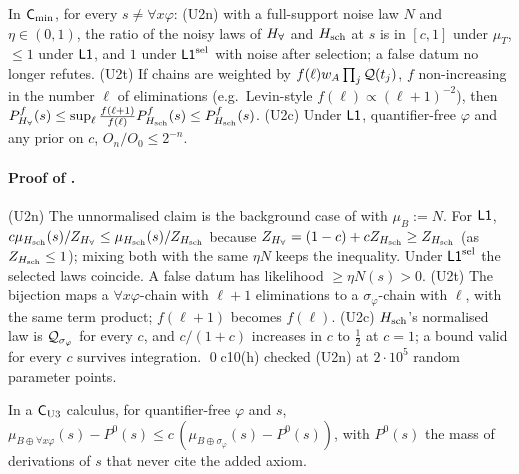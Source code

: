 \begin{proposition}\label{prop:univ:robust}
In $\mathsf{C}_{\min}$, for every $s\neq\forall x\varphi$: \textup{(U2n)} with a full-support noise law $N$ and $\eta\in(0,1)$, the ratio of the noisy laws of $H_{\forall}$ and $H_{\mathrm{sch}}$ at $s$ is in $[c,1]$ under $\mu_T$, $\le1$ under $\mathord{\mathsf{L1}}$, and $1$ under $\mathord{\mathsf{L1}}^{\mathrm{sel}}$ with noise after selection; a false datum no longer refutes. \textup{(U2t)} If chains are weighted by $f(\ell)w_A\prod_j\mathcal{Q}(t_j)$, $f$ non-increasing in the number $\ell$ of eliminations (e.g.\ Levin-style $f(\ell)\propto(\ell+1)^{-2}$), then $P^f_{H_{\forall}}(s)\le\sup_\ell\frac{f(\ell+1)}{f(\ell)}P^f_{H_{\mathrm{sch}}}(s)\le P^f_{H_{\mathrm{sch}}}(s)$. \textup{(U2c)} Under $\mathord{\mathsf{L1}}$, quantifier-free $\varphi$ and any prior on $c$, $O_n/O_0\le2^{-n}$.
\end{proposition}

\paragraph{Proof of .} (U2n) The unnormalised claim is the background case of  with $\mu_B:=N$. For $\mathord{\mathsf{L1}}$, $c\mu_{H_{\mathrm{sch}}}(s)/Z_{H_{\forall}}\le\mu_{H_{\mathrm{sch}}}(s)/Z_{H_{\mathrm{sch}}}$ because $Z_{H_{\forall}}=(1-c)+cZ_{H_{\mathrm{sch}}}\ge Z_{H_{\mathrm{sch}}}$ (as $Z_{H_{\mathrm{sch}}}\le1$); mixing both with the same $\eta N$ keeps the inequality. Under $\mathord{\mathsf{L1}}^{\mathrm{sel}}$ the selected laws coincide. A false datum has likelihood $\ge\eta N(s)>0$. (U2t) The bijection maps a $\forall x\varphi$-chain with $\ell+1$ eliminations to a $\sigma_\varphi$-chain with $\ell$, with the same term product; $f(\ell+1)$ becomes $f(\ell)$. (U2c) $H_{\mathrm{sch}}$'s normalised law is $\mathcal{Q}_{\sigma_\varphi}$ for every $c$, and $c/(1+c)$ increases in $c$ to $\tfrac12$ at $c=1$; a bound valid for every $c$ survives integration. \qed c10(h) checked (U2n) at $2\cdot10^5$ random parameter points.

\begin{proposition}\label{prop:univ:sim}
In a $\mathsf{C}_{\mathrm{U3}}$ calculus, for quantifier-free $\varphi$ and $s$, $\mu_{B\oplus\forall x\varphi}(s)-P^0(s)\le c\,(\mu_{B\oplus\sigma_\varphi}(s)-P^0(s))$, with $P^0(s)$ the mass of derivations of $s$ that never cite the added axiom.
\end{proposition}

